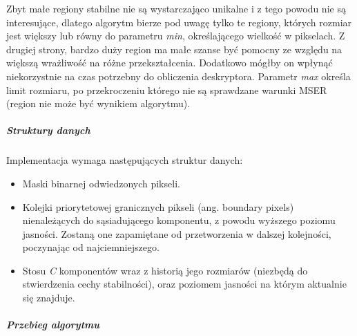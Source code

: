 Zbyt małe regiony stabilne nie są wystarczająco unikalne i z tego powodu nie są
interesujące, dlatego algorytm bierze pod uwagę tylko te regiony, których
rozmiar jest większy lub równy do parametru \textit{min}, określającego
wielkość w pikselach. Z drugiej strony, bardzo duży region ma małe szanse być
pomocny ze względu na większą wrażliwość na różne przekształcenia. Dodatkowo
mógłby on wpłynąć niekorzystnie na czas potrzebny do obliczenia deskryptora.
Parametr \textit{max} określa limit rozmiaru, po przekroczeniu którego nie są
sprawdzane warunki MSER (region nie może być wynikiem algorytmu).

\subparagraph{Struktury danych}

Implementacja wymaga następujących struktur danych: \begin{itemize} \item Maski
    binarnej odwiedzonych pikseli.  \item Kolejki priorytetowej granicznych
    pikseli (ang. boundary pixels) nienależących do sąsiadującego komponentu, z
    powodu wyższego poziomu jasności. Zostaną one zapamiętane od przetworzenia
    w dalszej kolejności, poczynając od najciemniejszego.  \item Stosu
    \textit{C} komponentów wraz z historią jego rozmiarów (niezbędą do
    stwierdzenia cechy stabilności), oraz poziomem jasności na którym aktualnie
    się znajduje.  \end{itemize}

\subparagraph{Przebieg algorytmu}

